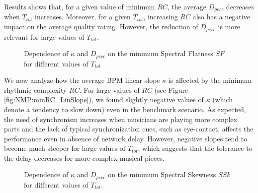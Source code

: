 Results shows that, for a given value of minimum $RC$, the average $D_{perc}$ decreases when $T_{tot}$ increases. Moreover, for a given $T_{tot}$, increasing $RC$ also has a negative impact on the average quality rating. However, the reduction of $D_{perc}$ is more relevant for large values of $T_{tot}$. 

\begin{figure}[!tb]
\begin{flushright}
    \hfil
\end{flushright}
\caption{Dependence of $\kappa$ and $D_{perc}$ on the minimum Spectral Flatness $SF$ for different values of $T_{tot}$}
\label{fig:NMP:minSF}
\end{figure}

We now analyze how the average BPM linear slope $\kappa$ is affected by the minimum rhythmic complexity $RC$. For large values of $RC$ (see Figure \ref{fig:NMP:minRC_LinSlope}), we found slightly negative values of $\kappa$ (which denote a tendency to slow down) even in the benchmark scenario. As expected, the need of synchronism increases when musicians are playing more complex parts and the lack of typical synchronization cues, such as eye-contact, affects the performance even in absence of network delay. However, negative slopes tend to become much steeper for large values of $T_{tot}$, which suggests that the tolerance to the delay decreases for more complex musical pieces.

\begin{figure}[!tb]
\begin{flushright}
    \hfil
\end{flushright}
\caption{Dependence of $\kappa$ and $D_{perc}$ on the minimum Spectral Skewness $SSk$ for different values of $T_{tot}$.}
\label{fig:NMP:minSSk}
\end{figure}

